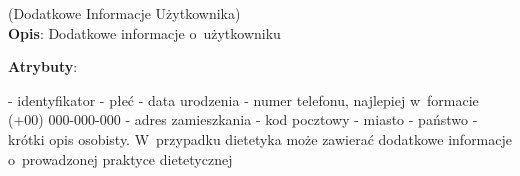 \begin{enumerate}[label={\textbf{KAT/1/\protect\twodigits{\theenumi}}}, wide, labelwidth=!, labelindent=0pt, labelsep=0pt, series=reqs]
    \label{kat:UserExtraInfo} (Dodatkowe Informacje Użytkownika)\\
    \indent\textbf{Opis}: Dodatkowe informacje o~użytkowniku
    \par
    \textbf{Atrybuty}:
    \begin{itemize}[series=atr, wide, align=left, leftmargin=190pt]
        \label{kat:UserExtraInfo:id}- identyfikator
        \label{kat:UserExtraInfo:gender}- płeć
        \label{kat:UserExtraInfo:dateOfBirth}- data urodzenia
        \label{kat:UserExtraInfo:phoneNumber}- numer telefonu, najlepiej w~formacie (+00) 000-000-000
        \label{kat:UserExtraInfo:streetAddress}- adres zamieszkania
        \label{kat:UserExtraInfo:postalCode}- kod pocztowy
        \label{kat:UserExtraInfo:city}- miasto
        \label{kat:UserExtraInfo:country}- państwo
        \label{kat:UserExtraInfo:personalDescription}- krótki opis osobisty. W~przypadku dietetyka może zawierać dodatkowe informacje o~prowadzonej praktyce dietetycznej
    \end{itemize}


\end{enumerate}
